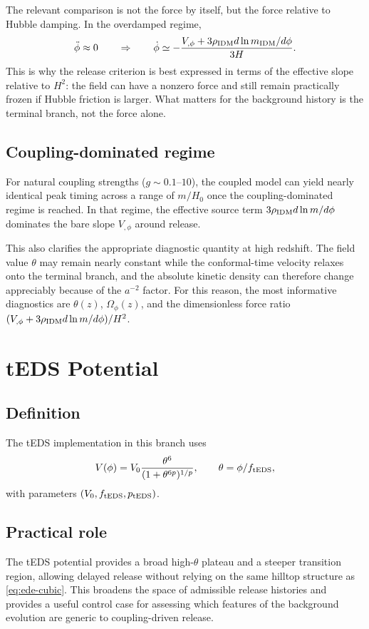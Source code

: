 \documentclass[aps,onecolumn,prd,nofootinbib,superscriptaddress,10pt,longbibliography,floatfix]{revtex4-2}
\begin{document}
The relevant comparison is not the force by itself, but the force relative to Hubble damping. In the overdamped regime,
\begin{equation}
\ddot{\phi} \approx 0
\qquad \Rightarrow \qquad
\dot{\phi}\simeq -\frac{V_{,\phi}+3\rho_{\rm IDM}d\ln m_{\rm IDM}/d\phi}{3H}.
\end{equation}
This is why the release criterion is best expressed in terms of the effective slope relative to $H^2$: the field can have a nonzero force and still remain practically frozen if Hubble friction is larger. What matters for the background history is the terminal branch, not the force alone.

\subsection{Coupling-dominated regime}
For natural coupling strengths ($g\sim0.1$--$10$), the coupled model can yield nearly identical peak timing across a range of $m/H_0$ once the coupling-dominated regime is reached. In that regime, the effective source term $3\rho_{\rm IDM} d\ln m/d\phi$ dominates the bare slope $V_{,\phi}$ around release.

This also clarifies the appropriate diagnostic quantity at high redshift. The field value $\theta$ may remain nearly constant while the conformal-time velocity relaxes onto the terminal branch, and the absolute kinetic density can therefore change appreciably because of the $a^{-2}$ factor. For this reason, the most informative diagnostics are $\theta(z)$, $\Omega_\phi(z)$, and the dimensionless force ratio $(V_{,\phi}+3\rho_{\rm IDM}d\ln m/d\phi)/H^2$.

\section{tEDS Potential}
\subsection{Definition}
The tEDS implementation in this branch uses
\begin{equation}
V(\phi)=V_0\frac{\theta^6}{(1+\theta^{6p})^{1/p}},\qquad \theta=\phi/f_{\rm tEDS},
\label{eq:teds}
\end{equation}
with parameters $(V_0,f_{\rm tEDS},p_{\rm tEDS})$.

\subsection{Practical role}
The tEDS potential provides a broad high-$\theta$ plateau and a steeper transition region, allowing delayed release without relying on the same hilltop structure as \cref{eq:ede-cubic}. This broadens the space of admissible release histories and provides a useful control case for assessing which features of the background evolution are generic to coupling-driven release.
\end{document}
